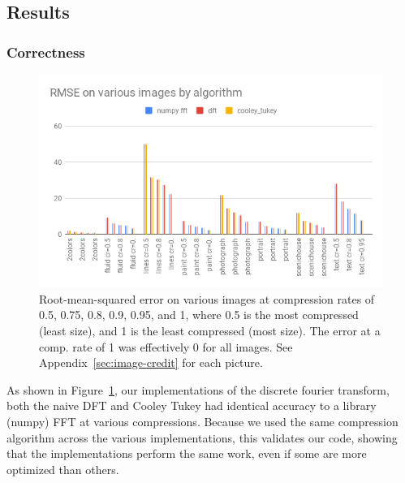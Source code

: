 \subsection{Results}
		\subsubsection{Correctness}
		\begin{figure}[h]
			\includegraphics[width=\linewidth]{images/algorithm-accuracy.png}
			\caption{Root-mean-squared error on various images at compression rates of 0.5, 0.75, 0.8, 0.9, 0.95, and 1, where 0.5 is the most compressed (least size), and 1 is the least compressed (most size). The error at a comp. rate of 1 was effectively 0 for all images. See Appendix~\ref{sec:image-credit} for each picture.}
			\label{fig:accuracy}
		\end{figure}

		As shown in Figure~\ref{fig:accuracy}, our implementations of the discrete fourier transform, both the naive DFT and Cooley Tukey had identical accuracy to a library (numpy) FFT at various compressions. Because we used the same compression algorithm across the various implementations, this validates our code, showing that the implementations perform the same work, even if some are more optimized than others.

